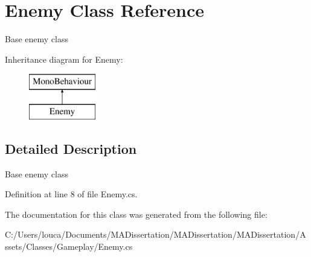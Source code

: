 \hypertarget{class_enemy}{}\section{Enemy Class Reference}
\label{class_enemy}


Base enemy class  


Inheritance diagram for Enemy\+:\begin{figure}[H]
\begin{center}
\leavevmode
\includegraphics[height=2.000000cm]{class_enemy}
\end{center}
\end{figure}


\subsection{Detailed Description}
Base enemy class 



Definition at line 8 of file Enemy.\+cs.



The documentation for this class was generated from the following file\+:\begin{DoxyCompactItemize}
\item 
C\+:/\+Users/louca/\+Documents/\+M\+A\+Dissertation/\+M\+A\+Dissertation/\+M\+A\+Dissertation/\+Assets/\+Classes/\+Gameplay/Enemy.\+cs\end{DoxyCompactItemize}
